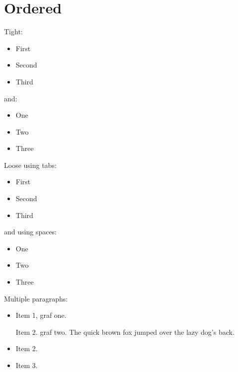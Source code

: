 \section{Ordered}

Tight:
\begin{itemize}
  \item{First}
  \item{Second}
  \item{Third}
\end{itemize}

and:
\begin{itemize}
  \item{One}
  \item{Two}
  \item{Three}
\end{itemize}

Loose using tabs:
\begin{itemize}
  \item{
  
  First}
  \item{
  
  Second}
  \item{
  
  Third}
\end{itemize}

and using spaces:
\begin{itemize}
  \item{
  
  One}
  \item{
  
  Two}
  \item{
  
  Three}
\end{itemize}

Multiple paragraphs:
\begin{itemize}
  \item{
    
    Item 1, graf one.
    
    Item 2. graf two. The quick brown fox jumped over the lazy dog's back.
  }
  \item{
  
  Item 2.}
  \item{
  
  Item 3.}
\end{itemize}